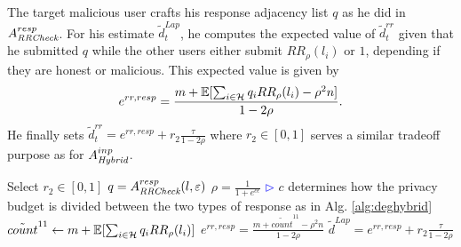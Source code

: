 The target malicious user crafts his response adjacency list $q$ as he did in $A_{\textit{RRCheck}}^{resp}$. For his estimate $\tilde{d}_t^{Lap}$, he computes the expected value of $\tilde{d}_t^{rr}$ given that he submitted $q$ while the other users either submit $RR_\rho(l_i)$ or $1$, depending if they are honest or malicious. This expected value is given by
\[
e^{rr, resp} = \frac{m + \operatorname{\mathbb{E}}[\sum_{i \in \mathcal{H}} q_i RR_\rho(l_i) - \rho^2 n]}{1-2\rho}.
\]
He finally sets $\tilde{d}_t^{rr} = e^{rr,resp} + r_2 \frac{\tau}{1-2\rho}$ where $r_2 \in [0,1]$ serves a similar tradeoff purpose as for $A_{\textit{Hybrid}}^{inp}$. 

\begin{algorithm}[bt]
  Select $r_2\in [0,1]$\;
	$q=A_{\textit{RRCheck}}^{resp}(l, \varepsilon)$\;
	$\rho=\frac{1}{1+e^{c\epsilon}}$\;
	\hfill\textcolor{blue}{$\rhd$} $c$ determines how the privacy budget is divided between the two types of response as in Alg. \ref{alg:deghybrid}\;
	$\tilde{count}^{11} \gets m + \operatorname{\mathbb{E}}[\sum_{i \in \mathcal{H}} q_i RR_\rho(l_i)]$\;
	$e^{rr,resp} = \frac{m + \tilde{count}^{11} - \rho^2 n}{1-2\rho}$\;
	$\tilde{d}^{Lap} = e^{rr,resp} + r_2 \frac{\tau}{1-2\rho}$\;
  \caption{$A_{\DegHybrid}^{resp}: \{0,1\}^n\mapsto\{0,1\}^n$ }
\end{algorithm}

%  
%  


